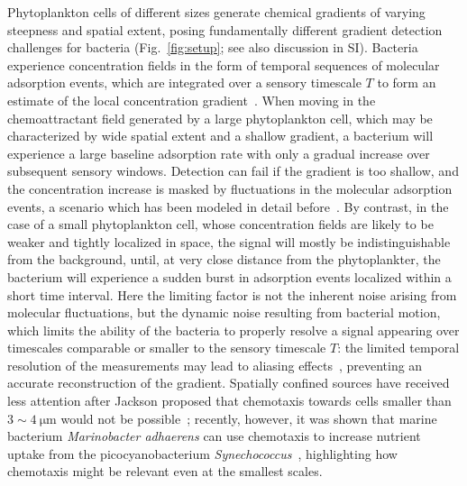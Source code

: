 \documentclass[9pt,twocolumn,twoside]{pnas-new}
\begin{document}
Phytoplankton cells of different sizes generate chemical gradients of varying steepness and spatial extent, posing fundamentally different gradient detection challenges for bacteria (Fig.~\ref{fig:setup}; see also discussion in SI).
Bacteria experience concentration fields in the form of temporal sequences of molecular adsorption events, which are integrated over a sensory timescale $T$ to form an estimate of the local concentration gradient~\cite{berg1977physics}. When moving in the chemoattractant field generated by a large phytoplankton cell, which may be characterized by wide spatial extent and a shallow gradient, a bacterium will experience a large baseline adsorption rate with only a gradual increase over subsequent sensory windows. Detection can fail if the gradient is too shallow, and the concentration increase is masked by fluctuations in the molecular adsorption events, a scenario which has been modeled in detail before~\cite{mora2010limits}.
By contrast, in the case of a small phytoplankton cell, whose concentration fields are likely to be weaker and tightly localized in space, the signal will mostly be indistinguishable from the background, until, at very close distance from the phytoplankter, the bacterium will experience a sudden burst in adsorption events localized within a short time interval.
Here the limiting factor is not the inherent noise arising from molecular fluctuations, but the dynamic noise resulting from bacterial motion, which limits the ability of the bacteria to properly resolve a signal appearing over timescales comparable or smaller to the sensory timescale $T$: the limited temporal resolution of the measurements may lead to aliasing effects~\cite{}, preventing an accurate reconstruction of the gradient.
Spatially confined sources have received less attention after Jackson proposed that chemotaxis towards cells smaller than $3\sim\SI{4}{\micro\m}$ would not be possible~\cite{jackson1987simulating}; recently, however, it was shown that marine bacterium \emph{Marinobacter adhaerens} can use chemotaxis to increase nutrient uptake from the picocyanobacterium \emph{Synechococcus}~\cite{raina2023chemotaxis}, highlighting how chemotaxis might be relevant even at the smallest scales.
\end{document}
